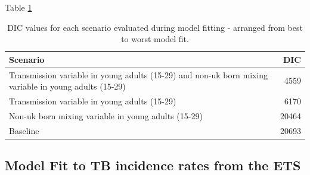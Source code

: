 \documentclass[11pt,twoside]{bristolthesis}
\begin{document}
  Table \ref{tab:09-scenarios-table}
  \begin{longtable}{>{\raggedright\arraybackslash}p{10cm}r}
  \caption{\label{tab:09-scenarios-table}DIC values for each scenario evaluated during model fitting - arranged from best to worst model fit.}\\
  \toprule
  Scenario & DIC\\
  \midrule
  Transmission variable in young adults (15-29) and non-uk born mixing variable in young adults (15-29) & 4559\\
  Transmission variable in young adults (15-29) & 6170\\
  Non-uk born mixing variable in young adults (15-29) & 20464\\
  Baseline & 20693\\
  \bottomrule
  \end{longtable}
  \hypertarget{model-fit-to-tb-incidence-rates-from-the-ets}{%
  \subsection{Model Fit to TB incidence rates from the ETS}\label{model-fit-to-tb-incidence-rates-from-the-ets}}
  
\end{document}
